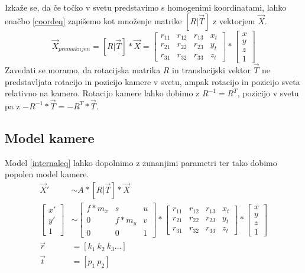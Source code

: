 \documentclass[a4paper, 12pt]{book}
\begin{document}
Izkaže se, da če točko v svetu predstavimo s homogenimi koordinatami, lahko enačbo \eqref{coordeq} zapišemo kot množenje matrike $[R | \vec{T}]$ z vektorjem $\vec{X}$.
\begin{equation}
\vec{X}_{premaknjen} = [R|\vec{T}] * \vec{X} = 
\begin{bmatrix}
r_{11} & r_{12} & r_{13} & x_t\\
r_{21} & r_{22} & r_{23} & y_t\\
r_{31} & r_{32} & r_{33} & z_t
\end{bmatrix}
* 
\begin{bmatrix}
x \\
y \\
z \\
1
\end{bmatrix}
\label{coordeq}
\end{equation}
Zavedati se moramo, da rotacijska matrika $R$ in translacijski vektor $\vec{T}$ ne predstavljata rotacijo in pozicijo kamere v svetu, ampak rotacijo in pozicijo sveta relativno na kamero. Rotacijo kamere lahko dobimo z $R^{-1} = R^T$, pozicijo v svetu pa z $-R^{-1} * \vec{T} = -R^T * \vec{T}$.

\subsection{Model kamere}

Model \eqref{internaleq} lahko dopolnimo z zunanjimi parametri ter tako dobimo popolen model kamere.
\begin{align}
\label{totalmodel}
\vec{X}' &\sim A * [R | \vec{T}] * \vec{X} \\
\begin{bmatrix}
x' \\
y' \\
1
\end{bmatrix}
&\sim
\begin{bmatrix}
f*m_x & s & u \\
0 & f*m_y & v \\
0 & 0 & 1
\end{bmatrix}
*
\begin{bmatrix}
r_{11} & r_{12} & r_{13} & x_t\\
r_{21} & r_{22} & r_{23} & y_t\\
r_{31} & r_{32} & r_{33} & z_t
\end{bmatrix}
*
\begin{bmatrix}
x \\
y \\
z \\
1
\end{bmatrix} \\
\vec{r} &= [k_1 \ k_2 \ k_3 \dots] \\
\vec{t} &= [p_1 \ p_2]
\end{align}
\end{document}
